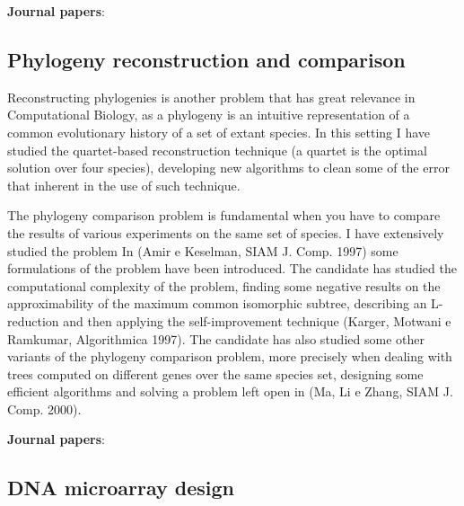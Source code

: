 \documentclass[11pt,a4paper,roman]{moderncv}
\begin{document}
\textbf{Journal
papers}:~\cite{baaijensComputationalGraphPangenomics2022,DBLP:journals/bioinformatics/DentiPPCVRB21,DBLP:journals/ipl/BonizzoniVDP10,DBLP:journals/tcbb/BonizzoniVDFRV07,DBLP:journals/informs/JustV04,DBLP:journals/dam/BonizzoniVM01,DBLP:journals/tcs/BonizzoniV01}

\subsection{Phylogeny reconstruction and
comparison}\label{phylogeny-reconstruction-and-comparison}

Reconstructing phylogenies is another problem that has great relevance
in Computational Biology, as a phylogeny is an intuitive representation
of a common evolutionary history of a set of extant species. In this
setting I have studied the quartet-based reconstruction technique (a
quartet is the optimal solution over four species), developing new
algorithms to clean some of the error that inherent in the use of such
technique.

The phylogeny comparison problem is fundamental when you have to compare
the results of various experiments on the same set of species. I have
extensively studied the problem In (Amir e Keselman, SIAM J. Comp. 1997)
some formulations of the problem have been introduced. The candidate has
studied the computational complexity of the problem, finding some
negative results on the approximability of the maximum common isomorphic
subtree, describing an L-reduction and then applying the
self-improvement technique (Karger, Motwani e Ramkumar, Algorithmica
1997). The candidate has also studied some other variants of the
phylogeny comparison problem, more precisely when dealing with trees
computed on different genes over the same species set, designing some
efficient algorithms and solving a problem left open in (Ma, Li e Zhang,
SIAM J. Comp. 2000).

\textbf{Journal
papers}:~\cite{DBLP:journals/jcb/AliCLVP21,DBLP:journals/bioinformatics/CiccolellaRGPSB21,DBLP:journals/bioinformatics/CiccolellaBDBPV21,DBLP:journals/bmcbi/CiccolellaGPVHB20,DBLP:journals/tcbb/BonizzoniCVS19,DBLP:journals/tcs/BonizzoniCVRT17,DBLP:journals/fuin/BonizzoniCVRT17,bonizzoniExplainingEvolutionConstrained2014,DBLP:journals/tcs/BonizzoniVD05,DBLP:journals/bioinformatics/VedovaW02,DBLP:journals/ijfcs/BonizzoniVM00}

\subsection{DNA microarray design}\label{dna-microarray-design}
\end{document}
